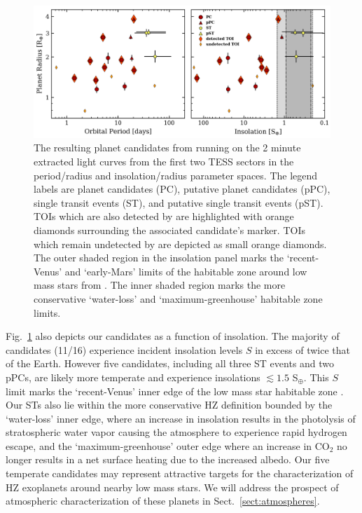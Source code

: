 \begin{figure}
  \centering
  \includegraphics[width=0.9\hsize]{figures/planetsample.png}
  \caption[Planetary parameters for the \texttt{ORION} planet candidate sample.]
      {The resulting planet candidates from running \pipeline{} on the 2 minute extracted light curves
    from the first two TESS sectors in the period/radius and insolation/radius parameter spaces.
    The legend labels are planet candidates (PC), putative planet candidates (pPC), 
    single transit events (ST), and putative single transit events (pST).
    TOIs which are also detected by \pipeline{} are highlighted with
    orange diamonds surrounding the associated candidate's marker. TOIs which remain undetected by \pipeline{}
    are depicted as small orange diamonds. %
    The outer shaded region in the insolation panel marks the `recent-Venus' and `early-Mars'
    limits of the habitable zone around low mass stars from \cite{kopparapu13}. The inner shaded region
    marks the more conservative `water-loss' and `maximum-greenhouse' habitable zone limits.}
  \label{fig:planets}
\end{figure}


Fig.~\ref{fig:planets} also depicts our candidates as a function of insolation. The majority of candidates
(11/16) experience incident insolation levels $S$ in excess of twice that of the Earth. However five candidates,
including all three ST events and two pPCs, are likely more temperate and experience insolations
$\lesssim 1.5$ S$_{\oplus}$.
This $S$ limit marks the `recent-Venus' inner edge of the low mass star habitable zone \citep[HZ;][]{kopparapu13}.
Our STs also lie within the more conservative HZ definition bounded by the `water-loss' inner
edge, where an increase in insolation results in the photolysis of stratospheric water vapor causing the atmosphere
to experience rapid hydrogen escape, and the `maximum-greenhouse' outer edge where an increase in CO$_2$ no longer
results in a net surface heating due to the increased albedo. Our five temperate candidates may represent attractive
targets for the characterization of HZ exoplanets around nearby low mass stars. We will address the prospect of
atmospheric characterization of these planets in Sect.~\ref{sect:atmospheres}.

